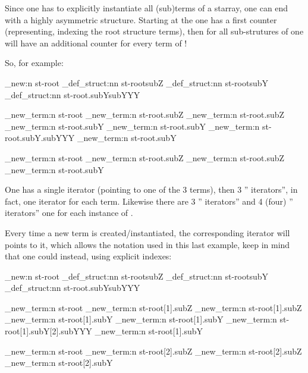 \documentclass[10pt]{article}
\begin{document}
Since one has to explicitly instantiate all (sub)terms of a starray, one can end with a highly asymmetric structure. Starting at the  one has a first counter (representing, indexing the root structure terms), then for all sub-strutures of  one will have an additional counter for every term of  !

So, for example:
\begin{codestore}[store-env=demo4]
\starray_new:n {st-root}
\starray_def_struct:nn {st-root}{subZ}
\starray_def_struct:nn {st-root}{subY}
\starray_def_struct:nn {st-root.subY}{subYYY}

\starray_new_term:n {st-root}
\starray_new_term:n {st-root.subZ}
\starray_new_term:n {st-root.subZ}
\starray_new_term:n {st-root.subY}
\starray_new_term:n {st-root.subY}
\starray_new_term:n {st-root.subY.subYYY}
\starray_new_term:n {st-root.subY}

\starray_new_term:n {st-root}
\starray_new_term:n {st-root.subZ}
\starray_new_term:n {st-root.subZ}
\starray_new_term:n {st-root.subY}
\end{codestore}


One has a single  iterator (pointing to one of the 3  terms), then 3 '' iterators'', in fact, one  iterator for each  term.
Likewise there are 3 '' iterators'' and 4 (four) '' iterators'' one for each instance of .

Every time a new term is created/instantiated, the corresponding iterator will points to it, which allows the notation used in this last example, keep in mind that one could instead, using explicit indexes:

\begin{codestore}[store-env=demo5]
\starray_new:n {st-root}
\starray_def_struct:nn {st-root}{subZ}
\starray_def_struct:nn {st-root}{subY}
\starray_def_struct:nn {st-root.subY}{subYYY}

\starray_new_term:n {st-root}
\starray_new_term:n {st-root[1].subZ}
\starray_new_term:n {st-root[1].subZ}
\starray_new_term:n {st-root[1].subY}
\starray_new_term:n {st-root[1].subY}
\starray_new_term:n {st-root[1].subY[2].subYYY}
\starray_new_term:n {st-root[1].subY}

\starray_new_term:n {st-root}
\starray_new_term:n {st-root[2].subZ}
\starray_new_term:n {st-root[2].subZ}
\starray_new_term:n {st-root[2].subY}
\end{codestore}
\end{document}
